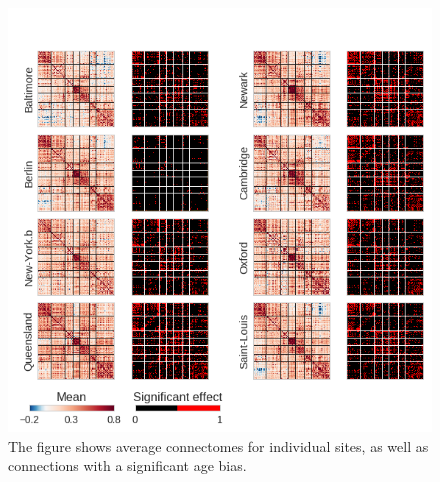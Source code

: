 \documentclass[authoryear]{elsarticle}
\begin{document}
\begin{figure}[htbp]
\begin{center}
\includegraphics[width=\linewidth]{../figures/connectome_multisite2_age.png}
\end{center}
\caption[Connectome variability across sites]{
The figure shows average connectomes for individual sites, as well as connections with a significant age bias.
}
\label{fig_connectome_variability_age}
\end{figure}
\end{document}
